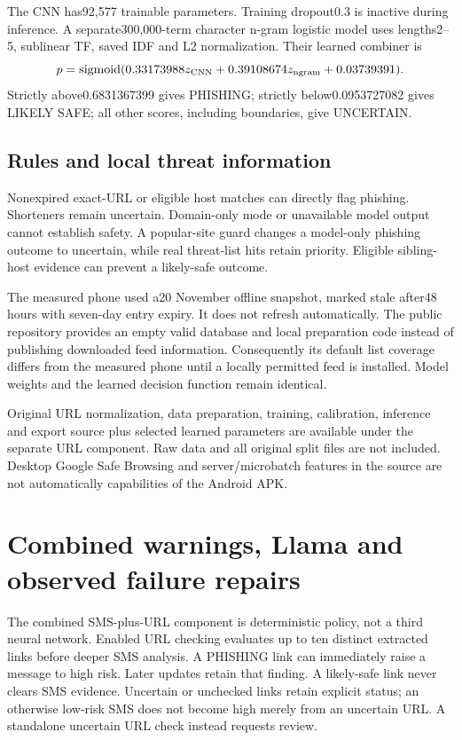 The CNN has92,577 trainable parameters. Training dropout0.3 is inactive during inference. A separate300,000-term character n-gram logistic model uses lengths2--5, sublinear TF, saved IDF and L2 normalization. Their learned combiner is
\[
p=\operatorname{sigmoid}(0.33173988z_{\rm CNN}
 +0.39108674z_{\rm ngram}+0.03739391).
\]
Strictly above0.6831367399 gives PHISHING; strictly below0.0953727082 gives LIKELY SAFE; all other scores, including boundaries, give UNCERTAIN.

\section{Rules and local threat information}
Nonexpired exact-URL or eligible host matches can directly flag phishing. Shorteners remain uncertain. Domain-only mode or unavailable model output cannot establish safety. A popular-site guard changes a model-only phishing outcome to uncertain, while real threat-list hits retain priority. Eligible sibling-host evidence can prevent a likely-safe outcome.

The measured phone used a20 November offline snapshot, marked stale after48 hours with seven-day entry expiry. It does not refresh automatically. The public repository provides an empty valid database and local preparation code instead of publishing downloaded feed information. Consequently its default list coverage differs from the measured phone until a locally permitted feed is installed. Model weights and the learned decision function remain identical.

Original URL normalization, data preparation, training, calibration, inference and export source plus selected learned parameters are available under the separate URL component. Raw data and all original split files are not included. Desktop Google Safe Browsing and server/microbatch features in the source are not automatically capabilities of the Android APK.

\chapter{Combined warnings, Llama and observed failure repairs}
The combined SMS-plus-URL component is deterministic policy, not a third neural network. Enabled URL checking evaluates up to ten distinct extracted links before deeper SMS analysis. A PHISHING link can immediately raise a message to high risk. Later updates retain that finding. A likely-safe link never clears SMS evidence. Uncertain or unchecked links retain explicit status; an otherwise low-risk SMS does not become high merely from an uncertain URL. A standalone uncertain URL check instead requests review.

